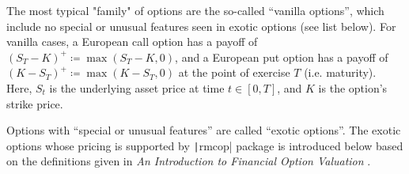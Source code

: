 The most typical "family" of options are the so-called ``vanilla options'', which include no special or unusual features seen in exotic options (see list below). For vanilla cases, a European call option has a payoff of $(S_T-K)^+ \coloneqq \max{(S_T-K,0)}$, and a European put option has a payoff of $(K-S_T)^+ \coloneqq \max{(K-S_T,0)}$ \cite{Glasserman2003} at the point of exercise $T$ (i.e. maturity). Here, $S_t$ is the underlying asset price at time $t\in[0,T]$, and $K$ is the option's strike price.

Options with ``special or unusual features'' are called ``exotic options''. The exotic options whose pricing is supported by \texttt|rmcop| package is introduced below based on the definitions given in \textit{An Introduction to Financial Option Valuation} \cite{Higham2004}.

